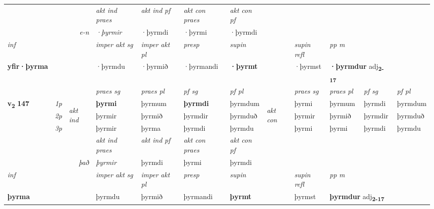 \begin{longtable}[l]{X>{\footnotesize\itshape}llXXXXlXXXX}
   && &  \textit{akt ind praes} & \textit{akt ind pf} & \textit{akt con praes} & \textit{akt con pf} \\*
\multicolumn{3}{r}{\textit{e-n}} & ·þyrmir & ·þyrmdi & ·þyrmi & ·þyrmdi \\*

\cmidrule{4-7}
   {\textit{inf}} & &  & \textit{imper akt sg} & \textit{imper akt pl}   & \textit{presp} & \textit{supin} && \textit{supin refl} & \textit{pp m} \\*
  {\textbf{yfir\allowbreak ·þyrma}} & && ·þyrmdu  & ·þyrmið   & ·þyrmandi &  \textbf{·þyrmt} && ·þyrmst & \multicolumn{2}{l}{\textbf{·þyrmdur} adj\textbf{\textsubscript{2-17}}} \\*

\midrule

 & &   & \textit{praes sg}  & \textit{praes pl}    & \textit{ pf sg} & \textit{pf pl} & & \textit{praes sg}  & \textit{praes pl}    & \textit{pf sg} & \textit{pf pl }  \\ \cmidrule{4-7} \cmidrule{9-12}
 \multirow{2}{*}{{{\textbf{v{\textsubscript{2}}} \Large{\textbf{147}}}}}  & 1p & \multirow{3}{*}{\begin{turn}{90}\textit{akt ind}\end{turn}} & \textbf{þyrmi} & þyrmum & \textbf{þyrmdi} & þyrmdum & \multirow{3}{*}{\begin{turn}{90}\textit{akt con}\end{turn}} &þyrmi & þyrmum & þyrmdi & þyrmdum\\*
 & 2p &  &  þyrmir  & þyrmið & þyrmdir & þyrmduð & & þyrmir & þyrmið & þyrmdir & þyrmduð \\*
 & 3p &  & þyrmir & þyrma & þyrmdi & þyrmdu & & þyrmi & þyrmi& þyrmdi & þyrmdu \\*
\cmidrule{4-7} \cmidrule{9-12}

   && &  \textit{akt ind praes} & \textit{akt ind pf} & \textit{akt con praes} & \textit{akt con pf} \\*
\multicolumn{3}{r}{\textit{það}} & þyrmir & þyrmdi & þyrmi & þyrmdi \\*

\cmidrule{4-7}
   {\textit{inf}} & &  & \textit{imper akt sg} & \textit{imper akt pl}   & \textit{presp} & \textit{supin} && \textit{supin refl} & \textit{pp m} \\*
  {\textbf{þyrma}} & && þyrmdu  & þyrmið   & þyrmandi &  \textbf{þyrmt} && þyrmst & \multicolumn{2}{l}{\textbf{þyrmdur} adj\textbf{\textsubscript{2-17}}} \\*


\end{longtable}
